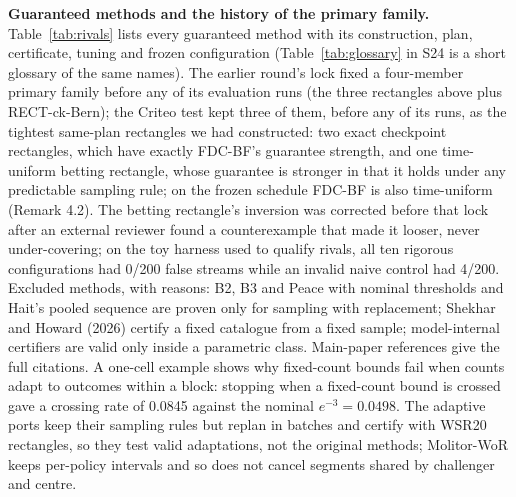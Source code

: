 \documentclass[sigconf,anonymous,review]{acmart}
\begin{document}
\textbf{Guaranteed methods and the history of the primary family.} Table~\ref{tab:rivals} lists every guaranteed method with its construction, plan, certificate, tuning and frozen configuration (Table~\ref{tab:glossary} in S24 is a short glossary of the same names). The earlier round's lock fixed a four-member primary family before any of its evaluation runs (the three rectangles above plus RECT-ck-Bern); the Criteo test kept three of them, before any of its runs, as the tightest same-plan rectangles we had constructed: two exact checkpoint rectangles, which have exactly FDC-BF's guarantee strength, and one time-uniform betting rectangle, whose guarantee is stronger in that it holds under any predictable sampling rule; on the frozen schedule FDC-BF is also time-uniform (Remark 4.2). The betting rectangle's inversion was corrected before that lock after an external reviewer found a counterexample that made it looser, never under-covering; on the toy harness used to qualify rivals, all ten rigorous configurations had 0/200 false streams while an invalid naive control had 4/200. Excluded methods, with reasons: B2, B3 and Peace with nominal thresholds and Hait's pooled sequence are proven only for sampling with replacement; Shekhar and Howard (2026) certify a fixed catalogue from a fixed sample; model-internal certifiers are valid only inside a parametric class. Main-paper references give the full citations. A one-cell example shows why fixed-count bounds fail when counts adapt to outcomes within a block: stopping when a fixed-count bound is crossed gave a crossing rate of 0.0845 against the nominal $e^{-3} = 0.0498$. The adaptive ports keep their sampling rules but replan in batches and certify with WSR20 rectangles, so they test valid adaptations, not the original methods; Molitor-WoR keeps per-policy intervals and so does not cancel segments shared by challenger and centre.
\end{document}
